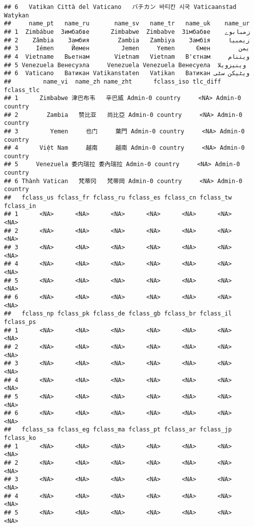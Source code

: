 \documentclass[
]{article}
\begin{document}
\begin{verbatim}
## 6   Vatikan Città del Vaticano   バチカン 바티칸 시국 Vaticaanstad   Watykan
##     name_pt   name_ru       name_sv   name_tr   name_uk    name_ur
## 1  Zimbábue  Зимбабве      Zimbabwe  Zimbabve  Зімбабве    زمبابوے
## 2    Zâmbia    Замбия        Zambia   Zambiya    Замбія     زیمبیا
## 3     Iémen     Йемен         Jemen     Yemen      Ємен        یمن
## 4  Vietname   Вьетнам       Vietnam   Vietnam   В'єтнам     ویتنام
## 5 Venezuela Венесуэла     Venezuela Venezuela Венесуела  وینیزویلا
## 6  Vaticano   Ватикан Vatikanstaten   Vatikan   Ватикан ویٹیکن سٹی
##         name_vi  name_zh name_zht      fclass_iso tlc_diff      fclass_tlc
## 1      Zimbabwe 津巴布韦   辛巴威 Admin-0 country     <NA> Admin-0 country
## 2        Zambia   赞比亚   尚比亞 Admin-0 country     <NA> Admin-0 country
## 3         Yemen     也门     葉門 Admin-0 country     <NA> Admin-0 country
## 4      Việt Nam     越南     越南 Admin-0 country     <NA> Admin-0 country
## 5     Venezuela 委内瑞拉 委內瑞拉 Admin-0 country     <NA> Admin-0 country
## 6 Thành Vatican   梵蒂冈   梵蒂岡 Admin-0 country     <NA> Admin-0 country
##   fclass_us fclass_fr fclass_ru fclass_es fclass_cn fclass_tw fclass_in
## 1      <NA>      <NA>      <NA>      <NA>      <NA>      <NA>      <NA>
## 2      <NA>      <NA>      <NA>      <NA>      <NA>      <NA>      <NA>
## 3      <NA>      <NA>      <NA>      <NA>      <NA>      <NA>      <NA>
## 4      <NA>      <NA>      <NA>      <NA>      <NA>      <NA>      <NA>
## 5      <NA>      <NA>      <NA>      <NA>      <NA>      <NA>      <NA>
## 6      <NA>      <NA>      <NA>      <NA>      <NA>      <NA>      <NA>
##   fclass_np fclass_pk fclass_de fclass_gb fclass_br fclass_il fclass_ps
## 1      <NA>      <NA>      <NA>      <NA>      <NA>      <NA>      <NA>
## 2      <NA>      <NA>      <NA>      <NA>      <NA>      <NA>      <NA>
## 3      <NA>      <NA>      <NA>      <NA>      <NA>      <NA>      <NA>
## 4      <NA>      <NA>      <NA>      <NA>      <NA>      <NA>      <NA>
## 5      <NA>      <NA>      <NA>      <NA>      <NA>      <NA>      <NA>
## 6      <NA>      <NA>      <NA>      <NA>      <NA>      <NA>      <NA>
##   fclass_sa fclass_eg fclass_ma fclass_pt fclass_ar fclass_jp fclass_ko
## 1      <NA>      <NA>      <NA>      <NA>      <NA>      <NA>      <NA>
## 2      <NA>      <NA>      <NA>      <NA>      <NA>      <NA>      <NA>
## 3      <NA>      <NA>      <NA>      <NA>      <NA>      <NA>      <NA>
## 4      <NA>      <NA>      <NA>      <NA>      <NA>      <NA>      <NA>
## 5      <NA>      <NA>      <NA>      <NA>      <NA>      <NA>      <NA>

\end{verbatim}
\end{document}
